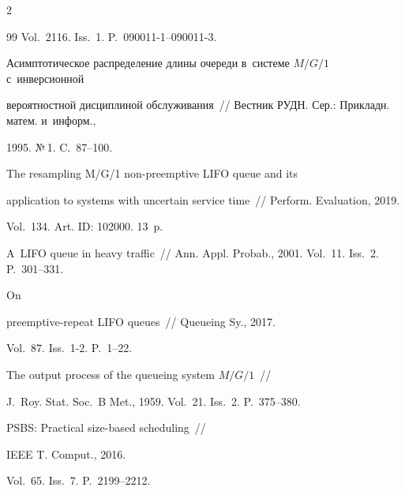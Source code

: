 \begin{multicols}{2}
{{\begin{thebibliography}{99}
Vol.~2116. Iss.~1. P.~090011-1--090011-3.





Асимптотическое распределение длины очереди в~системе $M/G/1$ с~инверсионной

вероятностной дисциплиной обслуживания~// Вестник РУДН. Сер.: Прикладн. матем. и~информ.,

1995. №\,1. C.~87--100.





The resampling M/G/1 non-preemptive LIFO queue and its 

application to systems with uncertain service time~// Perform. Evaluation, 2019. 

Vol.~134. Art. ID: 102000. 13~p.










 A~LIFO queue in heavy traffic~// Ann. Appl. Probab., 2001. Vol.~11. Iss.~2. P.~301--331.




 On 

preemptive-repeat LIFO queues~//  Queueing Sy., 2017. 

Vol.~87. Iss.~1-2. P.~1--22.







The output process of the queueing system $M/G/1$~//

J.~Roy. Stat. Soc.~B Met., 1959. Vol.~21. Iss.~2. P.~375--380.




 PSBS: Practical size-based scheduling~// 

IEEE T. Comput., 2016.

Vol.~65. Iss.~7. P.~2199--2212.





\end{thebibliography}}}
\end{multicols}
